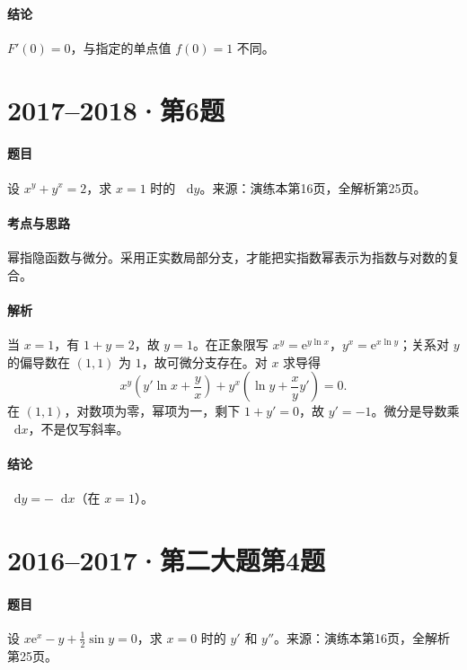 \documentclass[UTF8,fontset=fandol,12pt,oneside,openany]{ctexrep}
\newcommand{\dd}{\mathop{}\!\mathrm d}
\newcommand{\ee}{\mathrm e}
\theoremstyle{definition}
\begin{document}
\paragraph{结论}$F'(0)=0$，与指定的单点值 $f(0)=1$ 不同。

\par\addvspace{18pt}\noindent\begin{minipage}{\linewidth}
\section{2017--2018·第6题}
\paragraph{题目}设 $x^y+y^x=2$，求 $x=1$ 时的 $\dd y$。来源：演练本第16页，全解析第25页。
\end{minipage}\par
\paragraph{考点与思路}幂指隐函数与微分。采用正实数局部分支，才能把实指数幂表示为指数与对数的复合。
\paragraph{解析}当 $x=1$，有 $1+y=2$，故 $y=1$。在正象限写
$x^y=\ee^{y\ln x}$，$y^x=\ee^{x\ln y}$；关系对 $y$ 的偏导数在 $(1,1)$ 为 $1$，故可微分支存在。对 $x$ 求导得
\[
 x^y\left(y'\ln x+\frac yx\right)
 +y^x\left(\ln y+\frac{x}{y}y'\right)=0.
\]
在 $(1,1)$，对数项为零，幂项为一，剩下 $1+y'=0$，故 $y'=-1$。微分是导数乘 $\dd x$，不是仅写斜率。
\paragraph{结论}$\dd y=-\dd x$（在 $x=1$）。

\par\addvspace{18pt}\noindent\begin{minipage}{\linewidth}
\section{2016--2017·第二大题第4题}
\paragraph{题目}设 $x\ee^x-y+\tfrac12\sin y=0$，求 $x=0$ 时的 $y'$ 和 $y''$。来源：演练本第16页，全解析第25页。
\end{minipage}\par
\end{document}
